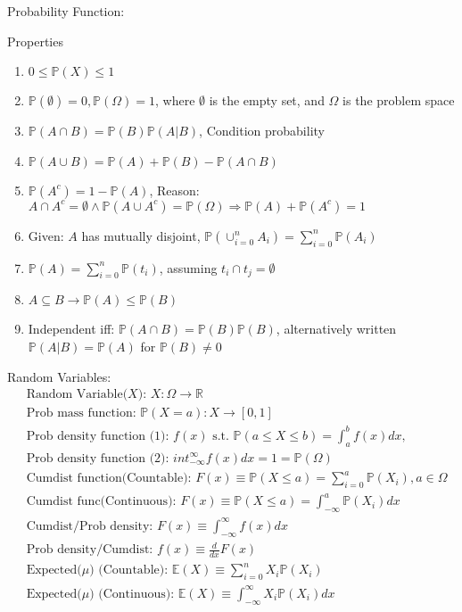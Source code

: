 \documentclass[12pt]{article}
\renewcommand{\=}[1]{\stackrel{#1}{=}} %
\theoremstyle{definition}
\theoremstyle{remark}
\begin{document}
\begin{description}
\item Probability Function:
\item Properties
  \begin{enumerate}
  \item $0 \leq \mathbb{P}(X) \leq 1$
  \item $\mathbb{P}(\emptyset) = 0, \mathbb{P}(\Omega)=1$, where
    $\emptyset$ is the empty set, and $\Omega$ is the problem space
  \item $\mathbb{P}(A\cap B) = \mathbb{P}(B)\mathbb{P}(A | B)$,
    Condition probability
  \item $\mathbb{P}(A\cup B) = \mathbb{P}(A) + \mathbb{P}(B) -
    \mathbb{P}(A\cap B)$
  \item $\mathbb{P}(A^c) = 1-\mathbb{P}(A)$, Reason: $A\cap A^c =
    \emptyset \wedge \mathbb{P}(A\cup A^c) = \mathbb{P}(\Omega)
    \Rightarrow \mathbb{P}(A)+\mathbb{P}(A^c) = 1$
  \item Given: $A$ has mutually disjoint, $\mathbb{P}(\cup_{i=0}^n
    A_i) = \sum_{i=0}^n\mathbb{P}(A_i) $
  \item $\mathbb{P}(A)=\sum_{i=0}^n\mathbb{P}({t_i})$, assuming ${t_i}\cap {t_j} = \emptyset$
  \item $A\subseteq B \rightarrow \mathbb{P}(A)\leq \mathbb{P}(B)$
  \item Independent iff: $\mathbb{P}(A\cap B) =
    \mathbb{P}(B)\mathbb{P}(B)$, alternatively written
    $\mathbb{P}(A|B) = \mathbb{P}(A)$ for $\mathbb{P}(B) \neq 0$ 
  \end{enumerate}
\end{description}

Random Variables:
\begin{align*}
  &\textrm{Random Variable($X$): } X:\Omega\rightarrow \mathbb{R} \\
  &\textrm{Prob mass function: } \mathbb{P}(X=a):X\rightarrow
  [0,1]\\
  &\textrm{Prob density function (1): $f(x)$ s.t. } \mathbb{P}(a \leq X
  \leq b) = \int_a^bf(x)dx, \\
  &\textrm{Prob density function (2): } int_{-\infty}^{\infty}f(x)dx = 1 =
  \mathbb{P}(\Omega)\\ 
  &\textrm{Cumdist function(Countable): } F(x) \equiv \mathbb{P}(X\leq a) =
  \sum_{i=0}^a\mathbb{P}(X_i), a\in\Omega \\
  &\textrm{Cumdist func(Continuous): } F(x) \equiv \mathbb{P}(X\leq a) =
  \int_{-\infty}^a\mathbb{P}(X_i)dx \\
  &\textrm{Cumdist/Prob density: } F(x) \equiv \int_{-\infty}^{\infty} f(x)dx \\
  &\textrm{Prob density/Cumdist: } f(x) \equiv \frac{d}{dx}F(x) \\
  &\textrm{Expected($\mu$) (Countable): }
  \mathbb{E}(X) \equiv \sum_{i=0}^nX_i\mathbb{P}(X_i) \\
  &\textrm{Expected($\mu$) (Continuous): } \mathbb{E}(X) \equiv \int_{-\infty}^{\infty}X_i\mathbb{P}(X_i)dx \\
\end{align*}
\end{document}
